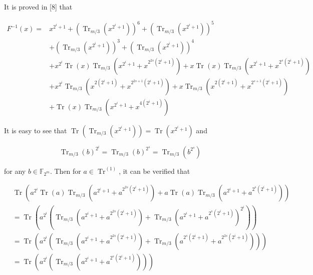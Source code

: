 \documentclass[10pt]{article}
\begin{document}
It is proved in [8] that

$$
\begin{aligned}
F^{-1}(x)= & x^{2^{i}+1}+\left(\operatorname{Tr}_{m / 3}\left(x^{2^{i}+1}\right)\right)^{6}+\left(\operatorname{Tr}_{m / 3}\left(x^{2^{i}+1}\right)\right)^{5} \\
& +\left(\operatorname{Tr}_{m / 3}\left(x^{2^{i}+1}\right)\right)^{3}+\left(\operatorname{Tr}_{m / 3}\left(x^{2^{i}+1}\right)\right)^{4} \\
& +x^{2^{i}} \operatorname{Tr}(x) \operatorname{Tr}_{m / 3}\left(x^{2^{i}+1}+x^{2^{2 s}\left(2^{i}+1\right)}\right)+x \operatorname{Tr}(x) \operatorname{Tr}_{m / 3}\left(x^{2^{i}+1}+x^{2^{s}\left(2^{i}+1\right)}\right) \\
& +x^{2^{i}} \operatorname{Tr}_{m / 3}\left(x^{2\left(2^{i}+1\right)}+x^{2^{2 s+1}\left(2^{i}+1\right)}\right)+x \operatorname{Tr}_{m / 3}\left(x^{2\left(2^{i}+1\right)}+x^{2^{s+1}\left(2^{i}+1\right)}\right) \\
& +\operatorname{Tr}(x) \operatorname{Tr}_{m / 3}\left(x^{2^{i}+1}+x^{4\left(2^{i}+1\right)}\right)
\end{aligned}
$$

It is easy to see that $\operatorname{Tr}\left(\operatorname{Tr}_{m / 3}\left(x^{2^{i}+1}\right)\right)=\operatorname{Tr}\left(x^{2^{i}+1}\right)$ and

$$
\operatorname{Tr}_{m / 3}(b)^{2^{i}}=\operatorname{Tr}_{m / 3}(b)^{2^{s}}=\operatorname{Tr}_{m / 3}\left(b^{2^{s}}\right)
$$

for any $b \in \mathbb{F}_{2^{m}}$. Then for $a \in \operatorname{Tr}^{(1)}$, it can be verified that

$$
\begin{aligned}
& \operatorname{Tr}\left(a^{2^{i}} \operatorname{Tr}(a) \operatorname{Tr}_{m / 3}\left(a^{2^{i}+1}+a^{2^{2 s}\left(2^{i}+1\right)}\right)+a \operatorname{Tr}(a) \operatorname{Tr}_{m / 3}\left(a^{2^{i}+1}+a^{2^{s}\left(2^{i}+1\right)}\right)\right) \\
& =\operatorname{Tr}\left(a^{2^{i}}\left(\operatorname{Tr}_{m / 3}\left(a^{2^{i}+1}+a^{2^{2 s}\left(2^{i}+1\right)}\right)+\operatorname{Tr}_{m / 3}\left(a^{2^{i}+1}+a^{2^{s}\left(2^{i}+1\right)}\right)^{2^{i}}\right)\right) \\
& =\operatorname{Tr}\left(a^{2^{i}}\left(\operatorname{Tr}_{m / 3}\left(a^{2^{i}+1}+a^{2^{2 s}\left(2^{i}+1\right)}\right)+\operatorname{Tr}_{m / 3}\left(a^{2^{s}\left(2^{i}+1\right)}+a^{2^{2 s}\left(2^{i}+1\right)}\right)\right)\right) \\
& =\operatorname{Tr}\left(a^{2^{i}}\left(\operatorname{Tr}_{m / 3}\left(a^{2^{i}+1}+a^{2^{s}\left(2^{i}+1\right)}\right)\right)\right)
\end{aligned}
$$
\end{document}
